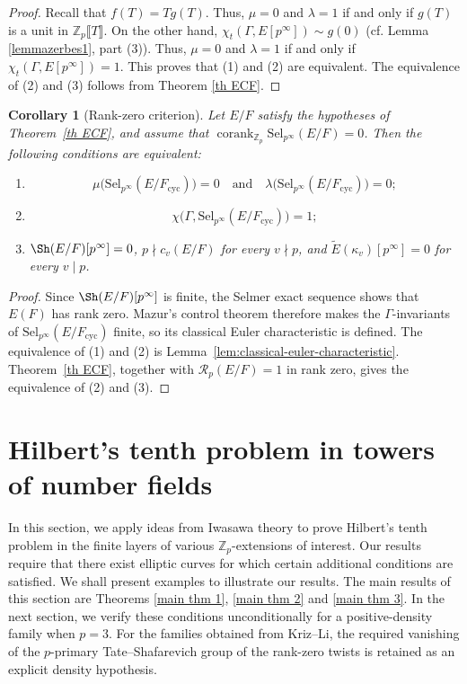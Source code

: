 \documentclass[12pt]{amsart}
\newtheorem{corollary}[theorem]{Corollary}
\newcommand{\Z}{\mathbb{Z}}
\newcommand{\Sel}{\mathrm{Sel}}
\newcommand{\op}[1]{\operatorname{#1}}
\numberwithin{equation}{section}
\begin{document}
\begin{proof}
Recall that $f(T)=T g(T)$. Thus, $\mu=0$ and $\lambda=1$ if and only if $g(T)$ is a unit in $\Z_p\llbracket T\rrbracket$. On the other hand, $\chi_t(\Gamma, E[p^\infty])\sim g(0)$ (cf. Lemma \ref{lemmazerbes1}, part (3)). Thus, $\mu=0$ and $\lambda=1$ if and only if $\chi_t(\Gamma, E[p^\infty])=1$. This proves that (1) and (2) are equivalent. The equivalence of (2) and (3) follows from Theorem \ref{th ECF}.
\end{proof}

\begin{corollary}[Rank-zero criterion]\label{cor:rank-zero}
Let $E/F$ satisfy the hypotheses of Theorem~\ref{th ECF}, and assume that $\op{corank}_{\Z_p}\Sel_{p^\infty}(E/F)=0$. Then the following conditions are equivalent:
\begin{enumerate}
    \item
    \[
    \mu\bigl(\Sel_{p^\infty}(E/F_{\op{cyc}})\bigr)=0
    \quad\text{and}\quad
    \lambda\bigl(\Sel_{p^\infty}(E/F_{\op{cyc}})\bigr)=0;
    \]
    \item
    \[
    \chi\bigl(\Gamma,\Sel_{p^\infty}(E/F_{\op{cyc}})\bigr)=1;
    \]
    \item $\Sh(E/F)[p^\infty]=0$, $p\nmid c_v(E/F)$ for every $v\nmid p$, and $\widetilde E(\kappa_v)[p^\infty]=0$ for every $v\mid p$.
\end{enumerate}
\end{corollary}
\begin{proof}
Since $\Sh(E/F)[p^\infty]$ is finite, the Selmer exact sequence shows that $E(F)$ has rank zero. Mazur's control theorem therefore makes the $\Gamma$-invariants of $\Sel_{p^\infty}(E/F_{\op{cyc}})$ finite, so its classical Euler characteristic is defined. The equivalence of (1) and (2) is Lemma~\ref{lem:classical-euler-characteristic}. Theorem~\ref{th ECF}, together with $\mathcal{R}_p(E/F)=1$ in rank zero, gives the equivalence of (2) and (3).
\end{proof}


\section{Hilbert's tenth problem in towers of number fields}\label{s 4}

\par In this section, we apply ideas from Iwasawa theory to prove Hilbert's tenth problem in the finite layers of various $\Z_p$-extensions of interest. Our results require that there exist elliptic curves for which certain additional conditions are satisfied. We shall present examples to illustrate our results. The main results of this section are Theorems \ref{main thm 1}, \ref{main thm 2} and \ref{main thm 3}. In the next section, we verify these conditions unconditionally for a positive-density family when $p=3$. For the families obtained from Kriz--Li, the required vanishing of the $p$-primary Tate--Shafarevich group of the rank-zero twists is retained as an explicit density hypothesis.
\end{document}
